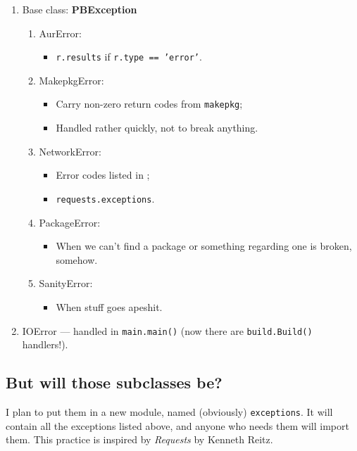 \documentclass[a4paper,english]{book}
\numberwithin{equation}{section}
\newcommand{\p}[1]{\nohyphens{\texttt{#1}}}
\begin{document}
\begin{enumerate}
\item Base class: \Large\bf PBException\normalsize\rm\osn
\begin{enumerate}

\item AurError:
\begin{itemize}
\item \p{r.results} if \p{r.type == 'error'}.
\end{itemize}

\item MakepkgError:
\begin{itemize}
\item Carry non-zero return codes from \p{makepkg};
\item Handled rather quickly, not to break anything.
\end{itemize}

\item NetworkError:
\begin{itemize}
\item Error codes listed in ;
\item \p{requests.exceptions}.
\end{itemize}

\item PackageError:
\begin{itemize}
\item When we can’t find a package or something regarding one is broken, somehow.
\end{itemize}

\item SanityError:
\begin{itemize}
\item When stuff goes apeshit.
\end{itemize}

\end{enumerate}
\item IOError — handled in \p{main.main()} (now there are \p{build.Build()} handlers!).
\end{enumerate}

\subsection{But will those subclasses be?}

I plan to put them in a new module, named (obviously) \p{exceptions}.  It will contain all the exceptions listed above, and anyone who needs them will import them.  This practice is inspired by \emph{Requests} by Kenneth Reitz.
\end{document}
